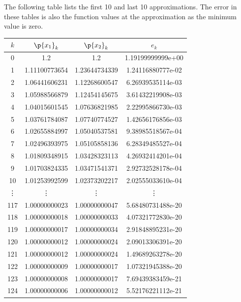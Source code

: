 \documentclass[11pt, oneside]{article}
\begin{document}
\begin{enumerate}
    The following table lists the first 10 and last 10 approximations.
    The error in these tables is also the function values at the approximation
    as the minimum value is zero.
    \begin{center}
      \begin{tabular}{cccc}
        \toprule
        $k$ & $\p{x_1}_k$ & $\p{x_2}_k$ & $e_k$ \\
        \midrule
          0 & 1.2           & 1.2           & 1.19199999999e+00 \\
          1 & 1.11100773654 & 1.23644734339 & 1.24116880777e-02 \\
          2 & 1.06441606231 & 1.12268600547 & 6.26939535114e-03 \\
          3 & 1.05988566879 & 1.12454145675 & 3.61432219908e-03 \\
          4 & 1.04015601545 & 1.07636821985 & 2.22995866730e-03 \\
          5 & 1.03761784087 & 1.07740774527 & 1.42656176856e-03 \\
          6 & 1.02655884997 & 1.05040537581 & 9.38985518567e-04 \\
          7 & 1.02496393975 & 1.05105858136 & 6.28349485527e-04 \\
          8 & 1.01809348915 & 1.03428323113 & 4.26932414201e-04 \\
          9 & 1.01703824335 & 1.03471541371 & 2.92732528178e-04 \\
         10 & 1.01253992599 & 1.02373202217 & 2.02555033610e-04 \\
        \vdots & \vdots & \vdots & \vdots \\
        117 & 1.00000000023 & 1.00000000047 & 5.68480731488e-20 \\
        118 & 1.00000000018 & 1.00000000033 & 4.07321772830e-20 \\
        119 & 1.00000000017 & 1.00000000034 & 2.91848895231e-20 \\
        120 & 1.00000000012 & 1.00000000024 & 2.09013306391e-20 \\
        121 & 1.00000000012 & 1.00000000024 & 1.49689263278e-20 \\
        122 & 1.00000000009 & 1.00000000017 & 1.07321945388e-20 \\
        123 & 1.00000000008 & 1.00000000017 & 7.69439383459e-21 \\
        124 & 1.00000000006 & 1.00000000012 & 5.52176221112e-21 \\

\end{tabular}
\end{center}
\end{enumerate}
\end{document}
